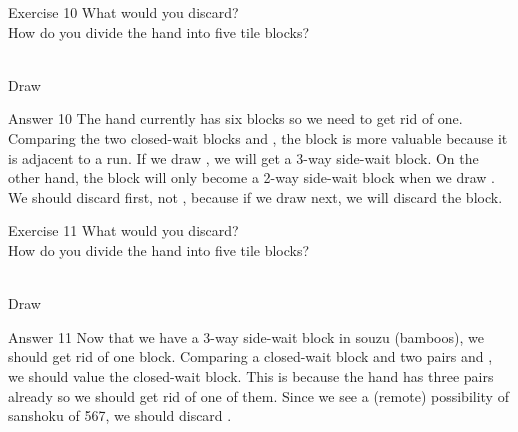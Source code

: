\vfill

\begin{itembox}[l]{Exercise 10}
What would you discard? \\
\vsp
How do you divide the hand into five tile blocks? 

\bp
{}\bei\bei~\\
\hfill\footnotesize{Draw~~~~~~~~~~~}
\ep
\end{itembox}

\newpage


\begin{itembox}[r]{Answer 10}
\emj
The hand currently has six blocks so we need to get rid of one. Comparing the two closed-wait blocks {\LARGE{}} and {\LARGE{}}, the {\LARGE{}} block is more valuable because it is adjacent to a run. If we draw {\LARGE{}}, we will get a 3-way side-wait block. On the other hand, the {\LARGE{}} block will only become a 2-way side-wait block when we draw {\LARGE{}}. We should discard {\LARGE{}} first, not {\LARGE{}}, because if we draw {\LARGE{}} next, we will discard the {\LARGE{}} block.
\end{itembox}

\vfill

\begin{itembox}[l]{Exercise 11}
What would you discard? \\
\vsp
How do you divide the hand into five tile blocks? 

\bp
{}~\\
\hfill\footnotesize{Draw~~~~~~~~~~~}
\ep
\end{itembox}

\newpage


\begin{itembox}[r]{Answer 11}
\emj
Now that we have a 3-way side-wait block in {\jap souzu} (bamboos), we should get rid of one block. Comparing a closed-wait block {\LARGE{}} and two pairs {\LARGE{}} and {\LARGE{}}, we should value the closed-wait block. This is because the hand has three pairs already so we should get rid of one of them. Since we see a (remote) possibility of {\jap sanshoku} of 567, we should discard {\LARGE{}}. 
\end{itembox}


